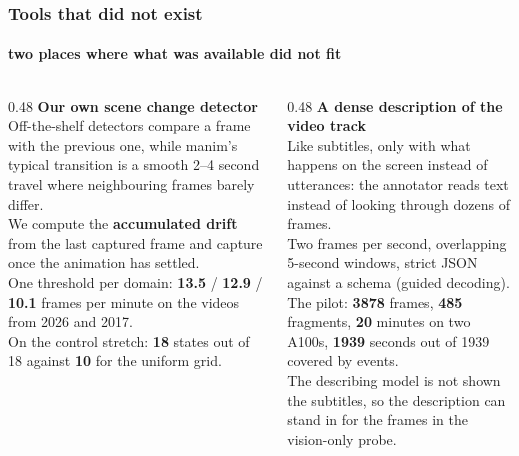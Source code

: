 \documentclass[aspectratio=169,10pt]{beamer}
\newcommand{\lead}[1]{{\color{warm}\textbf{#1}}}
\newcommand{\num}[1]{{\color{accent}\textbf{#1}}}
\begin{document}
\begin{frame}
  \frametitle{Tools that did not exist}
  \framesubtitle{two places where what was available did not fit}

  \begin{columns}[T]
    \begin{column}{0.48\textwidth}
      \textbf{Our own scene change detector}\\[0.4em]
      {\small
      Off-the-shelf detectors compare a frame with the previous one, while manim's typical
      transition is a smooth 2--4 second travel where neighbouring frames barely differ.\\[0.3em]
      We compute the \lead{accumulated drift} from the last captured frame and capture
      once the animation has settled.\\[0.3em]
      One threshold per domain: \num{13.5} / \num{12.9} / \num{10.1} frames per minute
      on the videos from 2026 and 2017.\\[0.3em]
      On the control stretch: \num{18} states out of 18 against \num{10} for the uniform grid.}
    \end{column}
    \begin{column}{0.48\textwidth}
      \textbf{A dense description of the video track}\\[0.4em]
      {\small
      Like subtitles, only with what happens on the screen instead of utterances:
      the annotator reads text instead of looking through dozens of frames.\\[0.3em]
      Two frames per second, overlapping 5-second windows, strict JSON against a schema
      (guided decoding).\\[0.3em]
      The pilot: \num{3878} frames, \num{485} fragments, \num{20} minutes on two A100s,
      \num{1939} seconds out of 1939 covered by events.\\[0.2em]
      \color{muted} The describing model is not shown the subtitles, so the description
      can stand in for the frames in the vision-only probe.}
    \end{column}
  \end{columns}
\end{frame}
\end{document}
